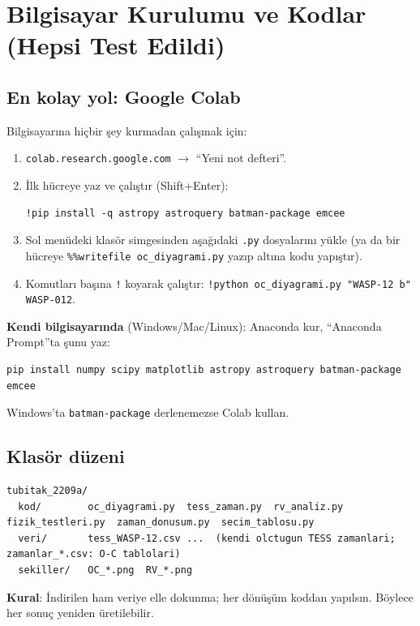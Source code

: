 \section{Bilgisayar Kurulumu ve Kodlar (Hepsi Test Edildi)}
\label{sec:kod}

\subsection{En kolay yol: Google Colab}
Bilgisayarına hiçbir şey kurmadan çalışmak için:
\begin{enumerate}[leftmargin=*]
\item \texttt{colab.research.google.com} $\rightarrow$ “Yeni not defteri”.
\item İlk hücreye yaz ve çalıştır (Shift+Enter):
\begin{lstlisting}[style=kabuk]
!pip install -q astropy astroquery batman-package emcee
\end{lstlisting}
\item Sol menüdeki klasör simgesinden aşağıdaki \texttt{.py} dosyalarını yükle (ya da bir hücreye
\texttt{\%\%writefile oc\_diyagrami.py} yazıp altına kodu yapıştır).
\item Komutları başına \texttt{!} koyarak çalıştır: \texttt{!python oc\_diyagrami.py "WASP-12 b" WASP-012}.
\end{enumerate}
\textbf{Kendi bilgisayarında} (Windows/Mac/Linux): Anaconda kur, “Anaconda Prompt”ta şunu yaz:
\begin{lstlisting}[style=kabuk]
pip install numpy scipy matplotlib astropy astroquery batman-package emcee
\end{lstlisting}
Windows'ta
\texttt{batman-package} derlenemezse Colab kullan.

\subsection{Klasör düzeni}
\begin{lstlisting}[style=kabuk]
tubitak_2209a/
  kod/        oc_diyagrami.py  tess_zaman.py  rv_analiz.py  fizik_testleri.py  zaman_donusum.py  secim_tablosu.py
  veri/       tess_WASP-12.csv ...  (kendi olctugun TESS zamanlari; zamanlar_*.csv: O-C tablolari)
  sekiller/   OC_*.png  RV_*.png
\end{lstlisting}
\textbf{Kural}: İndirilen ham veriye elle dokunma; her dönüşüm koddan yapılsın. Böylece her sonuç yeniden üretilebilir.

